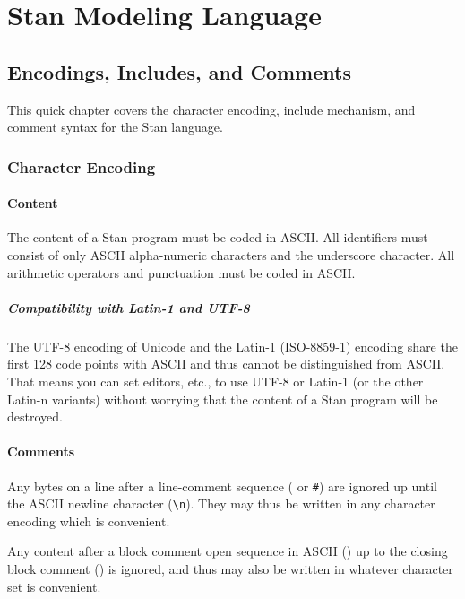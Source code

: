 \part{Stan Modeling Language}


\chapter{Encodings, Includes, and Comments}

\noindent
This quick chapter covers the character encoding, include mechanism,
and comment syntax for the Stan language.

\section{Character Encoding}

\subsection{Content}

The content of a Stan program must be coded in ASCII.  All identifiers
must consist of only ASCII alpha-numeric characters and the underscore
character.  All arithmetic operators and punctuation must be coded in
ASCII.

\subsubsection{Compatibility with Latin-1 and UTF-8}

The UTF-8 encoding of Unicode and the Latin-1 (ISO-8859-1) encoding
share the first 128 code points with ASCII and thus cannot be
distinguished from ASCII.  That means you can set editors, etc., to
use UTF-8 or Latin-1 (or the other Latin-n variants) without worrying
that the content of a Stan program will be destroyed.

\subsection{Comments}

Any bytes on a line after a line-comment sequence (\code{//} or
\Verb|#|) are ignored up until the ASCII newline character
(\Verb|\n|).  They may thus be written in any character encoding which
is convenient.

Any content after a block comment open sequence in ASCII (\code{/*})
up to the closing block comment (\code{*/}) is ignored, and thus may
also be written in whatever character set is convenient.

